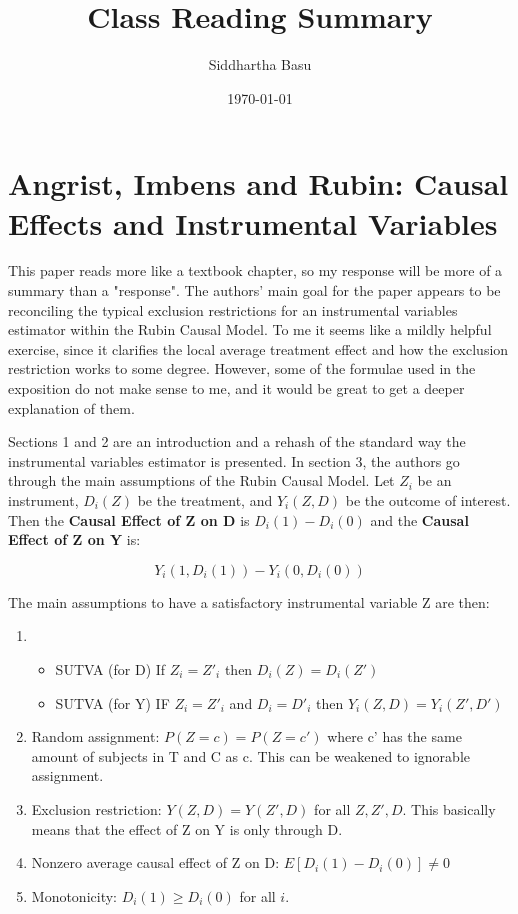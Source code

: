 \documentclass[12 pt, leqno]{article}
\begin{document}
\title{Class Reading Summary}
\author{Siddhartha Basu}
\date{\today}
\maketitle

\section{Angrist, Imbens and Rubin: Causal Effects and Instrumental Variables}

This paper reads more like a textbook chapter, so my response will be more of a summary than a "response". The authors' main goal for the paper appears to be reconciling the typical exclusion restrictions for an instrumental variables estimator within the Rubin Causal Model. To me it seems like a mildly helpful exercise, since it clarifies the local average treatment effect  and how the exclusion restriction works to some degree. However, some of the formulae used in the exposition do not make sense to me, and it would be great to get a deeper explanation of them. 

Sections 1 and 2 are an introduction and a rehash of the standard way the instrumental variables estimator is presented. In section 3, the authors go through the main assumptions of the Rubin Causal Model. Let $Z_i$ be an instrument, $D_i(Z)$ be the treatment, and $Y_i(Z,D)$ be the outcome of interest. Then the \textbf{Causal Effect of Z on D} is $D_i(1) - D_i(0)$ and the \textbf{Causal Effect of Z on Y} is:

$$Y_i(1, D_i(1)) - Y_i(0, D_i(0)) $$

The main assumptions to have a satisfactory instrumental variable Z are then:

\begin{enumerate}
\item  
	\begin{itemize}
	\item SUTVA (for D) If $Z_i = Z'_i$ then $D_i(Z) = D_i(Z')$
	\item SUTVA (for Y) IF $Z_i = Z'_i$ and $D_i = D'_i$ then $Y_i(Z,D) = Y_i(Z', D')$ 
	\end{itemize}
\item Random assignment: $P(Z = c) = P(Z = c')$ where c' has the same amount of subjects in T and C as c. This can be weakened to ignorable assignment. 
\item Exclusion restriction: $Y(Z,D) = Y(Z',D)$ for all $Z, Z', D$. This basically means that the effect of Z on Y is only through D.
\item Nonzero average causal effect of Z on D: $E[D_i(1) - D_i(0)] \neq 0$
\item Monotonicity: $D_i(1) \geq D_i(0)$ for all $i$. 
\end{enumerate}
\end{document}
